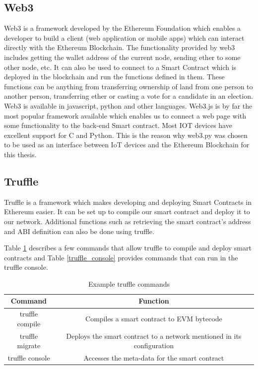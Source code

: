 \documentclass[11pt,openright]{report}
\begin{document}
\subsection{Web3}
Web3 is a framework developed by the Ethereum Foundation which enables a developer to build a client (web application or mobile apps) which can interact directly with the Ethereum Blockchain. The functionality provided by web3 includes getting the wallet address of the current node, sending ether to some other node, etc. It can also be used to connect to a Smart Contract which is deployed in the blockchain and run the functions defined in them. These functions can be anything from transferring ownership of land from one person to another person, transferring ether or casting a vote for a candidate in an election. Web3 is available in javascript, python and other languages. Web3.js is by far the most popular framework available which enables us to connect a web page with some functionality to the back-end Smart contract. Most IOT devices have excellent support for C and Python. This is the reason why web3.py was chosen to be used as an interface between IoT devices and the Ethereum Blockchain for this thesis.

\subsection{Truffle}
Truffle is a framework which makes developing and deploying Smart Contracts in Ethereum easier. It can be set up to compile our smart contract and deploy it to our network. Additional functions such as retrieving the smart contract's address and ABI definition can also be done using truffle.

Table \ref{truffle_commands} describes a few commands that allow truffle to compile and deploy smart contracts and Table \ref{truffle_console} provides commands that can run in the truffle console.

\begin{table}[!htbp]
    \renewcommand{\arraystretch}{1.3}
    \caption{Example truffle commands}
    \label{truffle_commands}
    \centering
    \begin{tabular}{|c|c|}
        \hline
        \bfseries Command & \bfseries Function \\
        \hline\hline
        truffle compile & Compiles a smart contract to EVM bytecode \\ \hline
        truffle migrate & Deploys the smart contract to a network mentioned in its configuration \\ \hline
        truffle console & Accesses the meta-data for the smart contract \\ \hline
    \end{tabular}
\end{table}
\end{document}
